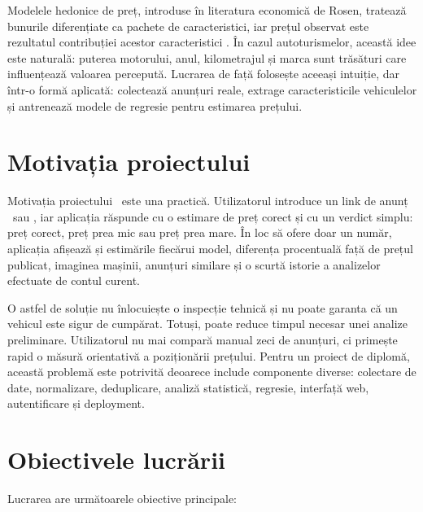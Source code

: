 Modelele hedonice de preț, introduse în literatura economică de Rosen, tratează bunurile diferențiate ca pachete de caracteristici, iar prețul observat este rezultatul contribuției acestor caracteristici \cite{rosen1974hedonic}. În cazul autoturismelor, această idee este naturală: puterea motorului, anul, kilometrajul și marca sunt trăsături care influențează valoarea percepută. Lucrarea de față folosește aceeași intuiție, dar într-o formă aplicată: colectează anunțuri reale, extrage caracteristicile vehiculelor și antrenează modele de regresie pentru estimarea prețului.

\section{Motivația proiectului}
\label{sec:intro-motivation}

Motivația proiectului \project\ este una practică. Utilizatorul introduce un link de anunț \autovit\ sau \mobilede, iar aplicația răspunde cu o estimare de preț corect și cu un verdict simplu: preț corect, preț prea mic sau preț prea mare. În loc să ofere doar un număr, aplicația afișează și estimările fiecărui model, diferența procentuală față de prețul publicat, imaginea mașinii, anunțuri similare și o scurtă istorie a analizelor efectuate de contul curent.

O astfel de soluție nu înlocuiește o inspecție tehnică și nu poate garanta că un vehicul este sigur de cumpărat. Totuși, poate reduce timpul necesar unei analize preliminare. Utilizatorul nu mai compară manual zeci de anunțuri, ci primește rapid o măsură orientativă a poziționării prețului. Pentru un proiect de diplomă, această problemă este potrivită deoarece include componente diverse: colectare de date, normalizare, deduplicare, analiză statistică, regresie, interfață web, autentificare și deployment.

\section{Obiectivele lucrării}
\label{sec:intro-objectives}

Lucrarea are următoarele obiective principale:

